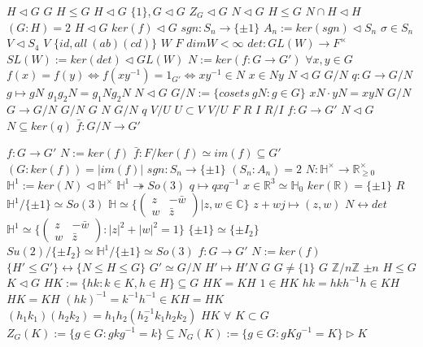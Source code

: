 \documentclass{article}
\begin{document}
$H \triangleleft G$
$G$
$H \leq G$
$H \triangleleft G$
$\{1\},G \triangleleft G$
$Z_G \triangleleft G$
$N \triangleleft G$
$H \leq G$
$N \cap H \triangleleft H$
$(G:H)=2$
$H \triangleleft G$
$ker(f) \triangleleft G$
$sgn:S_n \rightarrow \{ \pm 1\}$
$A_n:=ker(sgn) \triangleleft S_n$
$\sigma \in S_n$
$V \triangleleft S_4$
$V$
$\{id,all\ (ab)(cd)\}$
$W$
$F$
$dimW<\infty$
$det:GL(W) \rightarrow F^\times$
$SL(W):=ker(det) \triangleleft GL(W)$
$N:=ker(f:G \rightarrow G')$
$\forall x,y \in G$
$f(x)=f(y) \Longleftrightarrow f(xy^{-1})=1_{G'} \Longleftrightarrow xy^{-1} \in N$
$x \in Ny$
$N \triangleleft G$
$G/N$
$q:G \rightarrow G/N$
$g \mapsto gN$
$g_1g_2N=g_1Ng_2N$
$N \triangleleft G$
$G/N:=\{cosets\ gN:g \in G\}$
$xN \cdot yN=xyN$
$G/N$
$G \rightarrow G/N$
$G/N$
$G$
$N$
$G/N$
$q$
$V/U$
$U \subset V$
$V/U$
$F$
$R$
$I$
$R/I$
$f:G \rightarrow G'$
$N \triangleleft G$
$N \subseteq ker(q)$
$\bar{f}:G/N \rightarrow G'$
$f:G \rightarrow G'$
$N:=ker(f)$
$\bar{f}:F/ker(f) \simeq im(f) \subseteq G'$
$(G:ker(f))=|im(f)|$
$sgn:S_n \rightarrow \{\pm 1\}$
$(S_n:A_n)=2$
$N:\mathbb{H}^\times \rightarrow \mathbb{R}^\times_{\geq 0}$
$\mathbb{H}^1:=ker(N) \triangleleft \mathbb{H}^\times$
$\mathbb{H}^1 \twoheadrightarrow So(3)$
$q \mapsto qxq^{-1}$
$x \in \mathbb{R}^3 \simeq \mathbb{H}_0$
$ker(\mathbb{R})=\{\pm1\}$
$R$
$\mathbb{H}^1/\{\pm1\} \simeq So(3)$
$\mathbb{H} \simeq \{\begin{pmatrix}z&-\bar{w}\\ w&\bar{z}\end{pmatrix}|z,w \in \mathbb{C}\}$
$z+wj \mapsto (z,w)$
$N \leftrightarrow det$
$\mathbb{H}^1 \simeq \{\begin{pmatrix}z&-\bar{w}\\ w&\bar{z}\end{pmatrix}:|z|^2+|w|^2=1\}$
$\{\pm1\} \simeq \{ \pm I_2\}$
$Su(2)/\{\pm I_2\} \simeq \mathbb{H}^1/\{ \pm 1\} \simeq So(3)$
$f:G \rightarrow G'$
$N:=ker(f)$
$\{H' \leq G'\} \leftrightarrow \{N \leq H \leq G\}$
$G' \simeq G/N$
$H' \mapsto H'N$
$G$
$G \neq \{1\}$
$G$
$\mathbb{Z}/n\mathbb{Z}$
$\pm n$
$H \leq G$
$K \triangleleft G$
$HK:=\{hk:k \in K,h \in H\} \subseteq G$
$HK=KH$
$1 \in HK$
$hk=hkh^{-1}h \in KH$
$HK=KH$
$(hk)^{-1}=k^{-1}h^{-1} \in KH=HK$
$(h_1k_1)(h_2k_2)=h_1h_2(h_2^{-1}k_1h_2k_2)$
$HK$
$\forall$
$K \subset G$
$Z_G(K):=\{g \in G:gkg^{-1}=k\} \subseteq N_G(K):=\{g \in G:gKg^{-1}=K\} \triangleright K$
\end{document}
